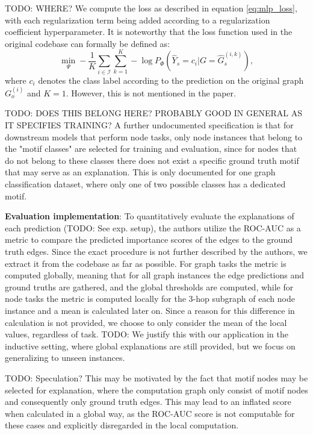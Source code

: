 TODO: WHERE? We compute the loss as described in equation \ref{eq:mlp_loss}, with each regularization term being added according to a regularization coefficient hyperparameter. It is noteworthy that the loss function used in the original codebase can formally be defined as:
\begin{equation}
    \min_\Psi -\frac{1}{K}\sum_{i\in \mathcal{I}}\sum_{k=1}^K -\log P_\Phi(\hat{Y}_s = c_i|G=\hat{G}_s^{(i,k)}),
\end{equation}
where $c_i$ denotes the class label according to the prediction on the original graph $G_o^{(i)}$ and $K=1$. However, this is not mentioned in the paper. 

TODO: DOES THIS BELONG HERE? PROBABLY GOOD IN GENERAL AS IT SPECIFIES TRAINING?
A further undocumented specification is that for downstream models that perform node tasks, only node instances that belong to the "motif classes" are selected for training and evaluation, since for nodes that do not belong to these classes there does not exist a specific ground truth motif that may serve as an explanation. This is only documented for one graph classification dataset, where only one of two possible classes has a dedicated motif.\bigskip

\textbf{Evaluation implementation}:
To quantitatively evaluate the explanations of each prediction (TODO: See exp. setup), the authors utilize the ROC-AUC as a metric to compare the predicted importance scores of the edges to the ground truth edges. Since the exact procedure is not further described by the authors, we extract it from the codebase as far as possible. For graph tasks the metric is computed globally, meaning that for all graph instances the edge predictions and ground truths are gathered, and the global thresholds are computed, while for node tasks the metric is computed locally for the $3$-hop subgraph of each node instance and a mean is calculated later on.
Since a reason for this difference in calculation is not provided, we choose to only consider the mean of the local values, regardless of task. TODO: We justify this with our application in the inductive setting, where global explanations are still provided, but we focus on generalizing to unseen instances.

TODO: Speculation? This may be motivated by the fact that motif nodes may be selected for explanation, where the computation graph only consist of motif nodes and consequently only ground truth edges. This may lead to an inflated score when calculated in a global way, as the ROC-AUC score is not computable for these cases and explicitly disregarded in the local computation.

